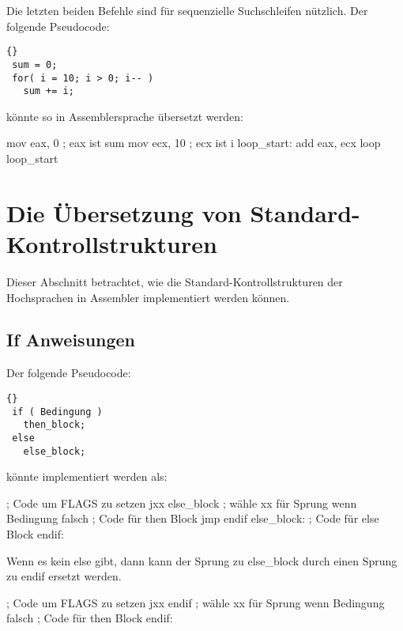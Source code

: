 Die letzten beiden Befehle sind f\"{u}r sequenzielle Suchschleifen
n\"{u}tzlich. Der folgende Pseudocode:
\begin{lstlisting}[numbers=none]{}
 sum = 0;
 for( i = 10; i > 0; i-- )
   sum += i;
\end{lstlisting}
\noindent k\"{o}nnte so in Assemblersprache \"{u}bersetzt werden:
\begin{AsmCodeListing}[frame=none, numbers=left]
      mov    eax, 0           ; eax ist sum
      mov    ecx, 10          ; ecx ist i
 loop_start:
      add    eax, ecx
      loop   loop_start
\end{AsmCodeListing}

\section[\"{U}bersetzung von Standard-Kontrollstrukturen]{Die \"{U}bersetzung von
Standard-Kontrollstrukturen}

Dieser Abschnitt betrachtet, wie die Standard-Kontrollstrukturen der
Hochsprachen in Assembler implementiert werden k\"{o}nnen.

\subsection{If Anweisungen }
Der folgende Pseudocode:
\begin{lstlisting}[numbers=none]{}
 if ( Bedingung )
   then_block;
 else
   else_block;
\end{lstlisting}
\noindent k\"{o}nnte implementiert werden als:
\begin{AsmCodeListing}[frame=none, numbers=left, commandchars=\\\{\}]
      ; Code um FLAGS zu setzen
      jxx    else_block       ; w\"{a}hle xx f\"{u}r Sprung wenn Bedingung falsch
      ; Code f\"{u}r then Block
      jmp    endif
 else_block:
      ; Code f\"{u}r else Block
 endif:
\end{AsmCodeListing}

Wenn es kein else gibt, dann kann der Sprung zu {\code else\_block}
durch einen Sprung zu {\code endif} ersetzt werden.
\begin{AsmCodeListing}[frame=none, numbers=left, firstnumber=last, commandchars=\\\{\}]
      ; Code um FLAGS zu setzen
      jxx    endif            ; w\"{a}hle xx f\"{u}r Sprung wenn Bedingung falsch
      ; Code f\"{u}r then Block
 endif:
\end{AsmCodeListing}


